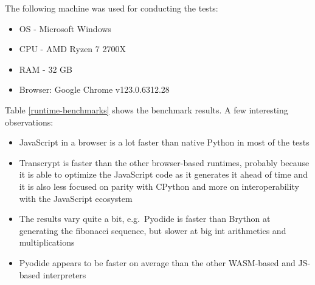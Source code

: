 The following machine was used for conducting the tests:

\begin{itemize}
\tightlist
\item
  OS - Microsoft Windows
\item
  CPU - AMD Ryzen 7 2700X
\item
  RAM - 32 GB
\item
  Browser: Google Chrome v123.0.6312.28
\end{itemize}

Table \ref{runtime-benchmarks} shows the benchmark results. A few interesting observations:

\begin{itemize}
\tightlist
\item
  JavaScript in a browser is a lot faster than native Python in most of the tests
\item
  Transcrypt is faster than the other browser-based runtimes, probably because it is able to optimize the JavaScript code as it generates it ahead of time and it is also less focused on parity with CPython and more on interoperability with the JavaScript ecosystem
\item
  The results vary quite a bit, e.g.~Pyodide is faster than Brython at generating the fibonacci sequence, but slower at big int arithmetics and multiplications
\item
  Pyodide appears to be faster on average than the other WASM-based and JS-based interpreters
\end{itemize}

